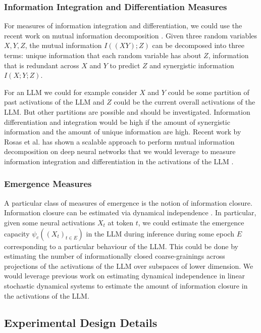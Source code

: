 \documentclass[11pt,a4paper]{article}
\begin{document}
\subsubsection{Information Integration and Differentiation Measures}

For measures of information integration and differentiation, we could use the recent work on mutual information decomposition \citep{Williams2010, Rosas2024}. Given three random variables $X, Y, Z$, the mutual information $I((X Y);Z)$ can be decomposed into three terms: unique information that each random variable has about $Z$, information that is redundant across $X$ and $Y$ to predict $Z$ and synergistic information $I(X; Y; Z)$. 

For an LLM we could for example consider $X$ and $Y$ could be some partition of past activations of the LLM and $Z$ could be the current overall activations of the LLM. But other partitions are possible and should be investigated. Information differentiation and integration would be high if the amount of synergistic information and the amount of unique information are high. Recent work by Rosas et al. has shown a scalable approach to perform mutual information decomposition on deep neural networks that we would leverage to measure information integration and differentiation in the activations of the LLM \citep{Rosas2024}.

\subsubsection{Emergence Measures}

A particular class of measures of emergence is the notion of information closure. Information closure can be estimated via dynamical independence \citep{Barnett2023}. In particular, given some neural activations $X_t$ at token $t$, we could estimate the emergence capacity $\psi_c((X_t)_{t\in E})$ in the LLM during inference during some epoch $E$ corresponding to a particular behaviour of the LLM. This could be done by estimating the number of informationally closed coarse-grainings across projections of the activations of the LLM over subspaces of lower dimension. We would leverage previous work on estimating dynamical independence in linear stochastic dynamical systems to estimate the amount of information closure in the activations of the LLM.

\subsection{Experimental Design Details}
\end{document}
